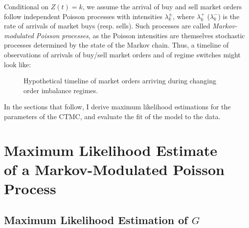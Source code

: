 Conditional on $Z(t) = k$, we assume the arrival of buy and sell market orders follow independent Poisson processes with intensities $\lambda_k^\pm$, where $\lambda_k^+$ ($\lambda_k^-$) is the rate of arrivals of market buys (resp. sells). Such processes are called \textit{Markov-modulated Poisson processes}, as the Poisson intensities are themselves stochastic processes determined by the state of the Markov chain. Thus, a timeline of observations of arrivals of buy/sell market orders and of regime switches might look like:
\begin{figure}
  \resizebox{\linewidth}{!}{}
\caption{Hypothetical timeline of market orders arriving during changing order imbalance regimes.}
\label{introtimeline}
\end{figure}

In the sections that follow, I derive maximum likelihood estimations for the parameters of the CTMC, and evaluate the fit of the model to the data.

\section[Maximum Likelihood Estimate of a Markov-Modulated Poisson Process]{Maximum Likelihood Estimate \texorpdfstring{\\}{} of a Markov-Modulated Poisson Process}

\subsection{Maximum Likelihood Estimation of \texorpdfstring{$G$}{G}}

